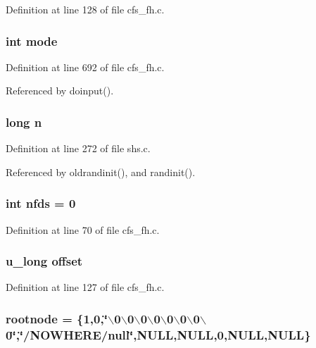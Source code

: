 Definition at line 128 of file cfs\_\-fh.c.
\subsubsection{\setlength{\rightskip}{0pt plus 5cm}int {\bf mode}}\label{cfs__fh_8c_a21}




Definition at line 692 of file cfs\_\-fh.c.

Referenced by doinput().
\subsubsection{\setlength{\rightskip}{0pt plus 5cm}long {\bf n}}\label{cfs__fh_8c_a29}




Definition at line 272 of file shs.c.

Referenced by oldrandinit(), and randinit().
\subsubsection{\setlength{\rightskip}{0pt plus 5cm}int {\bf nfds} = 0}\label{cfs__fh_8c_a6}




Definition at line 70 of file cfs\_\-fh.c.
\subsubsection{\setlength{\rightskip}{0pt plus 5cm}u\_\-long {\bf offset}}\label{cfs__fh_8c_a9}




Definition at line 127 of file cfs\_\-fh.c.
\subsubsection{ {\bf rootnode} = \{1,0,\char`\"{}$\backslash$0$\backslash$0$\backslash$0$\backslash$0$\backslash$0$\backslash$0$\backslash$0$\backslash$0\char`\"{},\char`\"{}/NOWHERE/null\char`\"{},NULL,NULL,0,NULL,NULL\}}\label{cfs__fh_8c_a16}




